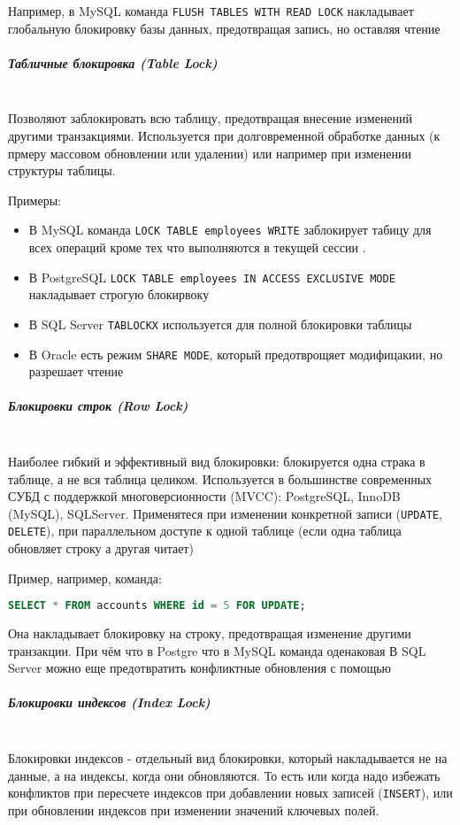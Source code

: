  Например, в MySQL команда \texttt{FLUSH TABLES WITH READ LOCK} накладывает глобальную блокировку базы данных, предотвращая запись, но оставляя чтение \autocite[§15.7.8.3]{Mysqldoc5}
 
 \subparagraph{Табличные блокировка (Table Lock)} ~\\
 Позволяют заблокировать всю таблицу, предотвращая внесение изменений другими транзакциями. Используется при долговременной обработке данных (к прмеру массовом обновлении или удалении) или например при изменении структуры таблицы.
 
 Примеры:
 \begin{itemize}
     \item В MySQL команда \texttt{LOCK TABLE employees WRITE} заблокирует табицу для всех операций кроме тех что выполняются в текущей сессии \autocite[§15.3.6]{Mysqldoc5}.
     \item В PostgreSQL \texttt{LOCK TABLE employees IN ACCESS EXCLUSIVE MODE} накладывает строгую блокирвоку \autocite{PgReference1}
     \item В SQL Server \texttt{TABLOCKX} используется для полной блокировки таблицы \autocite{MicrosoftLearnSQLserverTabHints}
     \item В Oracle есть режим \texttt{SHARE MODE}, который предотврощяет модифицакии, но разрешает чтение \autocite[ch.18]{oracledbreference}
 \end{itemize}
 
 \subparagraph{Блокировки строк (Row Lock)} ~\\
 Наиболее гибкий и эффективный вид блокировки: блокируется одна страка в таблице, а не вся таблица целиком. Используется в большинстве современных СУБД с поддержкой многоверсионности (MVCC): PostgreSQL, InnoDB (MySQL), SQLServer.
 Применятеся при изменении конкретной записи (\texttt{UPDATE}, \texttt{DELETE}), при параллельном доступе к одной таблице (если одна таблица обновляет строку а другая читает)
 
 Пример, например, команда:
 \begin{lstlisting}[language=SQL]
     SELECT * FROM accounts WHERE id = 5 FOR UPDATE;
 \end{lstlisting}
 Она накладывает блокировку на строку, предотвращая изменение другими транзакции. При чём что в Postgre что в MySQL команда оденаковая
 В SQL Server можно еще предотвратить конфликтные обновления с помощью \texttt{} \autocite{MicrosoftLearnSQLserverTabHints}
 
 \subparagraph{Блокировки индексов (Index Lock)} ~\\
 Блокировки индексов - отдельный вид блокировки, который накладывается не на данные, а на индексы, когда они обновляются. То есть или когда надо избежать конфликтов при пересчете индексов при добавлении новых записей (\texttt{INSERT}), или при обновлении индексов при изменении значений ключевых полей.
 
